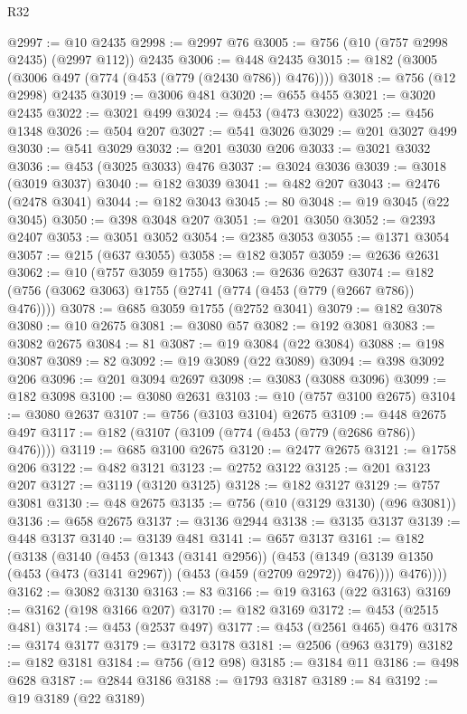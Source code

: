 \begin{lexlean}{R32}
\begin{coremodule}
@2997 := @10 @2435
@2998 := @2997 @76
@3005 := @756 (@10 (@757 @2998 @2435) (@2997 @112)) @2435
@3006 := @448 @2435
@3015 := @182 (@3005 (@3006 @497 (@774 (@453 (@779 (@2430 @786)) @476))))
@3018 := @756 (@12 @2998) @2435
@3019 := @3006 @481
@3020 := @655 @455
@3021 := @3020 @2435
@3022 := @3021 @499
@3024 := @453 (@473 @3022)
@3025 := @456 @1348
@3026 := @504 @207
@3027 := @541 @3026
@3029 := @201 @3027 @499
@3030 := @541 @3029
@3032 := @201 @3030 @206
@3033 := @3021 @3032
@3036 := @453 (@3025 @3033) @476
@3037 := @3024 @3036
@3039 := @3018 (@3019 @3037)
@3040 := @182 @3039
@3041 := @482 @207
@3043 := @2476 (@2478 @3041)
@3044 := @182 @3043
@3045 := 80
@3048 := @19 @3045 (@22 @3045)
@3050 := @398 @3048 @207
@3051 := @201 @3050
@3052 := @2393 @2407
@3053 := @3051 @3052
@3054 := @2385 @3053
@3055 := @1371 @3054
@3057 := @215 (@637 @3055)
@3058 := @182 @3057
@3059 := @2636 @2631
@3062 := @10 (@757 @3059 @1755)
@3063 := @2636 @2637
@3074 := @182 (@756 (@3062 @3063) @1755 (@2741 (@774 (@453 (@779 (@2667 @786)) @476))))
@3078 := @685 @3059 @1755 (@2752 @3041)
@3079 := @182 @3078
@3080 := @10 @2675
@3081 := @3080 @57
@3082 := @192 @3081
@3083 := @3082 @2675
@3084 := 81
@3087 := @19 @3084 (@22 @3084)
@3088 := @198 @3087
@3089 := 82
@3092 := @19 @3089 (@22 @3089)
@3094 := @398 @3092 @206
@3096 := @201 @3094 @2697
@3098 := @3083 (@3088 @3096)
@3099 := @182 @3098
@3100 := @3080 @2631
@3103 := @10 (@757 @3100 @2675)
@3104 := @3080 @2637
@3107 := @756 (@3103 @3104) @2675
@3109 := @448 @2675 @497
@3117 := @182 (@3107 (@3109 (@774 (@453 (@779 (@2686 @786)) @476))))
@3119 := @685 @3100 @2675
@3120 := @2477 @2675
@3121 := @1758 @206
@3122 := @482 @3121
@3123 := @2752 @3122
@3125 := @201 @3123 @207
@3127 := @3119 (@3120 @3125)
@3128 := @182 @3127
@3129 := @757 @3081
@3130 := @48 @2675
@3135 := @756 (@10 (@3129 @3130) (@96 @3081))
@3136 := @658 @2675
@3137 := @3136 @2944
@3138 := @3135 @3137
@3139 := @448 @3137
@3140 := @3139 @481
@3141 := @657 @3137
@3161 := @182
    (@3138
      (@3140
        (@453
          (@1343 (@3141 @2956))
          (@453
            (@1349 (@3139 @1350 (@453 (@473 (@3141 @2967)) (@453 (@459 (@2709 @2972)) @476))))
            @476))))
@3162 := @3082 @3130
@3163 := 83
@3166 := @19 @3163 (@22 @3163)
@3169 := @3162 (@198 @3166 @207)
@3170 := @182 @3169
@3172 := @453 (@2515 @481)
@3174 := @453 (@2537 @497)
@3177 := @453 (@2561 @465) @476
@3178 := @3174 @3177
@3179 := @3172 @3178
@3181 := @2506 (@963 @3179)
@3182 := @182 @3181
@3184 := @756 (@12 @98)
@3185 := @3184 @11
@3186 := @498 @628
@3187 := @2844 @3186
@3188 := @1793 @3187
@3189 := 84
@3192 := @19 @3189 (@22 @3189)

\end{coremodule}
\end{lexlean}
